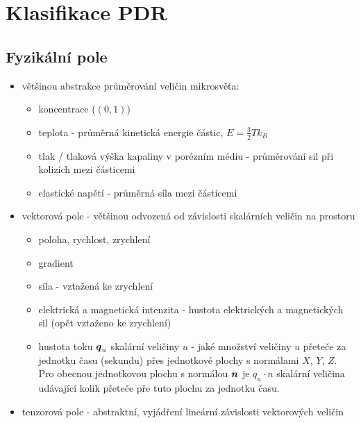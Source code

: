 \section{Klasifikace PDR}
\subsection{Fyzikální pole}
\begin{itemize}
 \item většinou abstrakce průměrování veličin mikrosvěta:
 \begin{itemize}
    \item koncentrace ($(0,1)$)
    \item teplota - průměrná kinetická energie částic, $ E = \frac{3}{2}T k_B$
    \item tlak / tlaková výška kapaliny v porézním médiu - průměrování sil při kolizích mezi částicemi
    \item elastické napětí - průměrná síla mezi částicemi
 \end{itemize}
 \item vektorová pole - většinou odvozená od závislosti skalárních veličin na prostoru
 \begin{itemize}
    \item poloha, rychlost, zrychlení
    \item gradient
    \item síla - vztažená ke zrychlení
    \item elektrická a magnetická intenzita - hustota elektrických a magnetických sil (opět vztaženo ke zrychlení)
    \item hustota toku $\mathbf{\boldsymbol{q}}_u$ skalární veličiny $u$ - jaké množství veličiny $u$ přeteče za 
    jednotku času (sekundu)
          přes jednotkové plochy s normálami $X$, $Y$, $Z$.\\
          Pro obecnou jednotkovou plochu s normálou $\mathbf{\boldsymbol{n}}$ je $q_u \cdot n$ skalární veličina 
          udávající kolik přeteče pře tuto plochu za jednotku času.          
 \end{itemize}

 \item tenzorová pole - abstraktní, vyjádření lineární závislosti vektorových veličin\\
 

\end{itemize}
